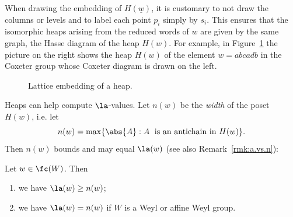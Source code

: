 When drawing the embedding of $H(\underline w)$, it is customary to not draw the columns or levels
and to label each point $p_i$ simply by $s_i$. This ensures that the isomorphic heaps arising from
the reduced words of $w$ are given by the same graph, the Hasse diagram of the heap $H(w)$. For
example, in Figure~\ref{fig:HeapExample} the picture on the right shows the heap $H(w)$ of the
element $w = abcadb$ in the Coxeter group whose Coxeter diagram is drawn on the left. 
\begin{figure} \centering
    \caption{Lattice embedding of a heap.}
    \label{fig:HeapExample}
\end{figure}

Heaps can help compute $\la$-values. Let $n(w)$ be the  \emph{width} of the poset $H(w)$, i.e. let 
\[
    n(w)= \max\{\abs{A}:A \text{\; is an antichain in $H(w)$}\}.
\]
Then $n(w)$ bounds and may equal $\la(w)$ (see also Remark~\ref{rmk:a.vs.n}):

\begin{prop}\label{prop:a=n}
    Let $w\in \fc(W)$. Then
    \begin{enumerate}
        \item we have $\la(w)\ge n(w)$;
        \item we have $\la(w)=n(w)$ if $W$ is a Weyl or affine Weyl group.
    \end{enumerate}
\end{prop}

